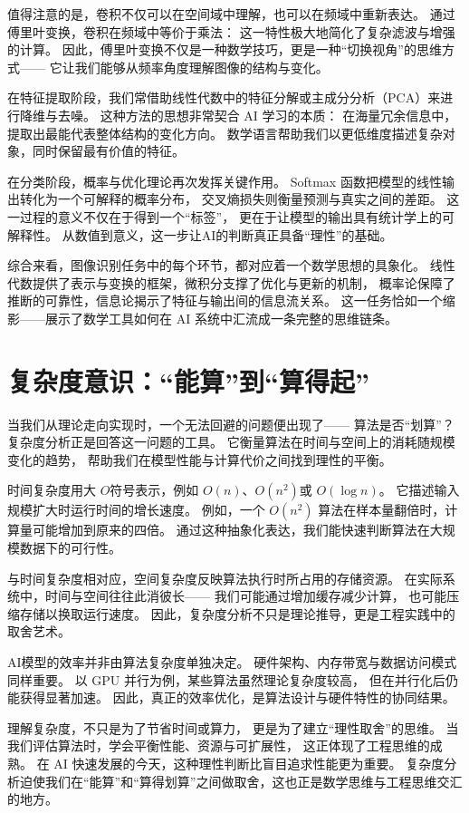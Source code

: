 值得注意的是，卷积不仅可以在空间域中理解，也可以在频域中重新表达。  
通过傅里叶变换，卷积在频域中等价于乘法：  
这一特性极大地简化了复杂滤波与增强的计算。  
因此，傅里叶变换不仅是一种数学技巧，更是一种“切换视角”的思维方式——  
它让我们能够从频率角度理解图像的结构与变化。

在特征提取阶段，我们常借助线性代数中的特征分解或主成分分析（PCA）来进行降维与去噪。  
这种方法的思想非常契合 AI 学习的本质：  
在海量冗余信息中，提取出最能代表整体结构的变化方向。  
数学语言帮助我们以更低维度描述复杂对象，同时保留最有价值的特征。

在分类阶段，概率与优化理论再次发挥关键作用。  
Softmax 函数把模型的线性输出转化为一个可解释的概率分布，  
交叉熵损失则衡量预测与真实之间的差距。  
这一过程的意义不仅在于得到一个“标签”，  
更在于让模型的输出具有统计学上的可解释性。  
从数值到意义，这一步让AI的判断真正具备“理性”的基础。

综合来看，图像识别任务中的每个环节，都对应着一个数学思想的具象化。  
线性代数提供了表示与变换的框架，微积分支撑了优化与更新的机制，  
概率论保障了推断的可靠性，信息论揭示了特征与输出间的信息流关系。  
这一任务恰如一个缩影——展示了数学工具如何在 AI 系统中汇流成一条完整的思维链条。

\section{复杂度意识：“能算”到“算得起”}

当我们从理论走向实现时，一个无法回避的问题便出现了——  
算法是否“划算”？  
复杂度分析正是回答这一问题的工具。  
它衡量算法在时间与空间上的消耗随规模变化的趋势，  
帮助我们在模型性能与计算代价之间找到理性的平衡。

时间复杂度用大 $O$符号表示，例如 $O(n)$、$O(n^2)$或 $O(\log n)$。  
它描述输入规模扩大时运行时间的增长速度。  
例如，一个 $O(n^2)$ 算法在样本量翻倍时，计算量可能增加到原来的四倍。  
通过这种抽象化表达，我们能快速判断算法在大规模数据下的可行性。

与时间复杂度相对应，空间复杂度反映算法执行时所占用的存储资源。  
在实际系统中，时间与空间往往此消彼长——  
我们可能通过增加缓存减少计算，  
也可能压缩存储以换取运行速度。  
因此，复杂度分析不只是理论推导，更是工程实践中的取舍艺术。

AI模型的效率并非由算法复杂度单独决定。  
硬件架构、内存带宽与数据访问模式同样重要。  
以 GPU 并行为例，某些算法虽然理论复杂度较高，  
但在并行化后仍能获得显著加速。  
因此，真正的效率优化，是算法设计与硬件特性的协同结果。

理解复杂度，不只是为了节省时间或算力，  
更是为了建立“理性取舍”的思维。  
当我们评估算法时，学会平衡性能、资源与可扩展性，  
这正体现了工程思维的成熟。  
在 AI 快速发展的今天，这种理性判断比盲目追求性能更为重要。
复杂度分析迫使我们在“能算”和“算得划算”之间做取舍，这也正是数学思维与工程思维交汇的地方。

